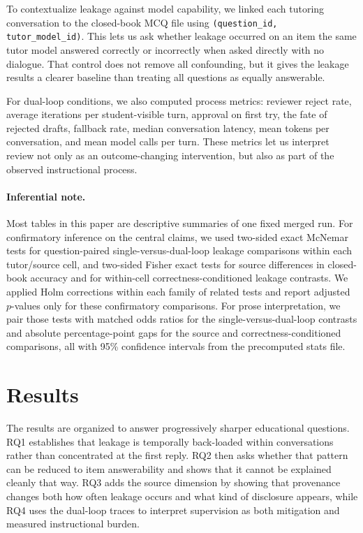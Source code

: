 \documentclass[manuscript,review,anonymous]{acmart}
\begin{document}
To contextualize leakage against model capability, we linked each tutoring conversation to the closed-book MCQ file using \texttt{(question\_id, tutor\_model\_id)}. This lets us ask whether leakage occurred on an item the same tutor model answered correctly or incorrectly when asked directly with no dialogue. That control does not remove all confounding, but it gives the leakage results a clearer baseline than treating all questions as equally answerable.

For dual-loop conditions, we also computed process metrics: reviewer reject rate, average iterations per student-visible turn, approval on first try, the fate of rejected drafts, fallback rate, median conversation latency, mean tokens per conversation, and mean model calls per turn. These metrics let us interpret review not only as an outcome-changing intervention, but also as part of the observed instructional process.

\paragraph{Inferential note.}
Most tables in this paper are descriptive summaries of one fixed merged run. For confirmatory inference on the central claims, we used two-sided exact McNemar tests for question-paired single-versus-dual-loop leakage comparisons within each tutor/source cell, and two-sided Fisher exact tests for source differences in closed-book accuracy and for within-cell correctness-conditioned leakage contrasts. We applied Holm corrections within each family of related tests and report adjusted $p$-values only for these confirmatory comparisons. For prose interpretation, we pair those tests with matched odds ratios for the single-versus-dual-loop contrasts and absolute percentage-point gaps for the source and correctness-conditioned comparisons, all with 95\% confidence intervals from the precomputed stats file.

\section{Results}

The results are organized to answer progressively sharper educational questions. RQ1 establishes that leakage is temporally back-loaded within conversations rather than concentrated at the first reply. RQ2 then asks whether that pattern can be reduced to item answerability and shows that it cannot be explained cleanly that way. RQ3 adds the source dimension by showing that provenance changes both how often leakage occurs and what kind of disclosure appears, while RQ4 uses the dual-loop traces to interpret supervision as both mitigation and measured instructional burden.
\end{document}
